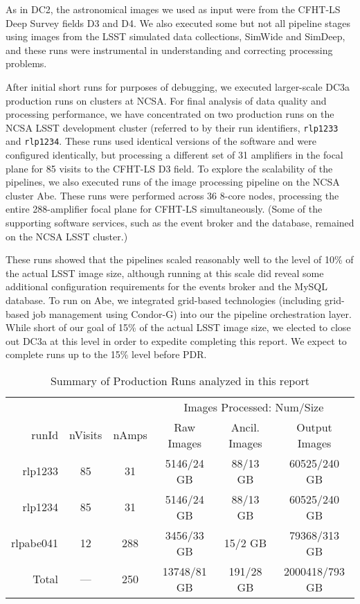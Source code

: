 As in DC2, the astronomical images we used as input were from the CFHT-LS
Deep Survey fields D3 and D4.  We also executed some but not all pipeline 
stages using images from the LSST simulated data collections, SimWide and
SimDeep, and these runs were instrumental in understanding and
correcting processing problems.

After initial short runs for purposes of debugging, 
we executed larger-scale DC3a production runs on clusters at
NCSA.  For final analysis of data quality and processing performance,
we have concentrated on two production runs on the NCSA LSST
development cluster (referred to by their run
identifiers, \texttt{rlp1233} and \texttt{rlp1234}. These runs used
identical versions of the software and were configured identically, but
processing a different set of 31 amplifiers in the focal plane for 85
visits to the CFHT-LS D3 field.  To explore the scalability of
the pipelines, we also executed runs of the image processing pipeline
on the NCSA cluster Abe.  These runs were performed across 36 8-core
nodes, processing the entire 288-amplifier focal plane for CFHT-LS
simultaneously.  (Some of the supporting software services, such as
the event broker and the database, remained on the NCSA LSST cluster.)

These runs showed that the pipelines scaled reasonably well to the
level of 10\% of the actual LSST image size, although running at this scale did reveal some additional
configuration requirements for the events broker and the MySQL
database.  To run on Abe, we integrated grid-based technologies
(including grid-based job management using Condor-G) into our the
pipeline orchestration layer.  While short of our goal of 15\% of the actual LSST image size,
we elected to close out DC3a at this level in order to expedite completing this report.
We expect to complete runs up to the 15\% level before PDR.

\begin{table}[ht]
\centering
\caption{Summary of Production Runs analyzed in this report
\label{ex:tbl:runsummary}}
\vspace{\baselineskip}
\begin{tabular}{rccccc}
\hline\hline
          &         &       & \multicolumn{3}{c}{Images Processed: Num/Size} \\
runId     & nVisits & nAmps & Raw Images & Ancil. Images & Output Images \\ \hline
rlp1233   & 85      & 31  & 5146/24 GB    & 88/13 GB       & 60525/240 GB \\ 
rlp1234   & 85      & 31  & 5146/24 GB    & 88/13 GB       & 60525/240 GB \\ 
rlpabe041 & 12      & 288 & 3456/33 GB    & 15/2 GB        & 79368/313 GB \\ \hline
Total     & ---     & 250 & 13748/81 GB   & 191/28 GB      & 2000418/793 GB \\ \hline
\end{tabular}
\end{table}

